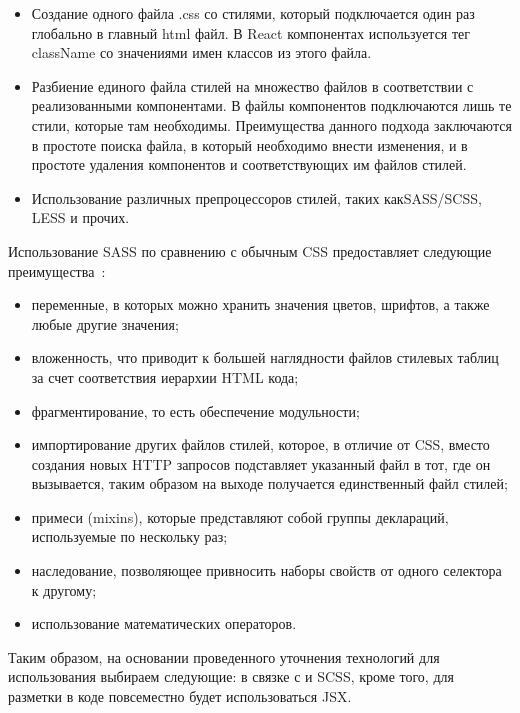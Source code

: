 \begin{itemize}
	\item Создание одного файла .css со стилями, который подключается один раз глобально в главный html файл. В React компонентах используется тег className со значениями имен классов из этого файла.
	\item Разбиение единого файла стилей на множество файлов в соответствии с реализованными компонентами. В файлы компонентов подключаются лишь те стили, которые там необходимы. Преимущества данного подхода заключаются в простоте поиска файла, в который необходимо внести изменения, и в простоте удаления компонентов и соответствующих им файлов стилей.
	\item Использование различных препроцессоров стилей, таких как\linebreak SASS/SCSS, LESS и прочих. 
\end{itemize}

Использование SASS по сравнению с обычным CSS предоставляет следующие преимущества~\cite{sass_guide}:

\begin{itemize}
	\item переменные, в которых можно хранить значения цветов, шрифтов, а также любые другие значения;
	\item вложенность, что приводит к большей наглядности файлов стилевых таблиц за счет соответствия иерархии HTML кода;
	\item фрагментирование, то есть обеспечение модульности;
	\item импортирование других файлов стилей, которое, в отличие от CSS, вместо создания новых HTTP запросов подставляет указанный файл в тот, где он вызывается, таким образом на выходе получается единственный файл стилей;
	\item примеси (mixins), которые представляют собой группы деклараций, используемые по нескольку раз;
	\item наследование, позволяющее привносить наборы свойств от одного селектора к другому;
	\item использование математических операторов.
\end{itemize}

Таким образом, на основании проведенного уточнения технологий для использования выбираем следующие: \react в связке с \mobx и SCSS, кроме того, для разметки в коде повсеместно будет использоваться JSX.

% 

